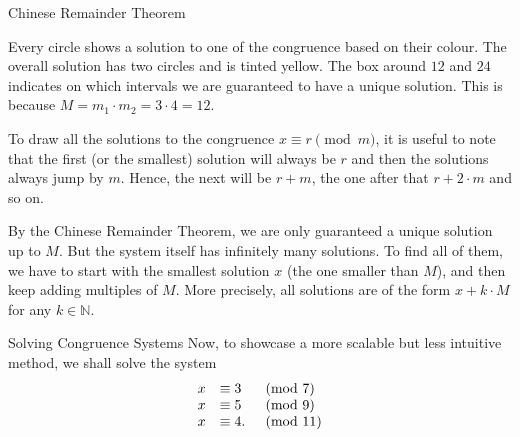 \documentclass[final]{beamer}
\newlength{\colwidth}
\newcommand{\N}{\mathbb{N}}
\begin{document}
\begin{frame}[t]
\begin{columns}[t]
\begin{column}{\colwidth}
\begin{alertblock}{Chinese Remainder Theorem}
\begin{center}
\end{center}
Every circle shows a solution to one of the congruence based on their colour.
The overall solution has two circles and is tinted yellow. The box around $12$
and $24$ indicates on which intervals we are guaranteed to have a unique
solution. This is because $M = m_1 \cdot m_2 = 3 \cdot 4 = 12$.

To draw all the solutions to the congruence $x \equiv r \pmod{m}$, it is useful
to note that the first (or the smallest) solution will always be $r$ and then
the solutions always jump by $m$. Hence, the next will be $r+m$, the one after
that $r+2 \cdot m$ and so on.

By the Chinese Remainder Theorem, we are only guaranteed a \alert{unique
solution up to $M$}. But the \alert{system itself has infinitely many
solutions}. To find all of them, we have to start with the smallest solution $x$
(the one smaller than $M$), and then keep adding multiples of $M$. More
precisely, \alert{all solutions are of the form $x + k \cdot M$} for any $k \in
\N$.
\end{alertblock}
 \begin{block}{Solving Congruence Systems}
  Now, to showcase a more scalable but less intuitive method, we shall solve the system
  \[
   \begin{array}{r l l}
    x & \equiv 3  &\pmod{7}\\
    x & \equiv 5  &\pmod{9}\\
    x & \equiv 4. &\pmod{11}
   \end{array}
  \]
  

\end{block}
\end{column}
\end{columns}
\end{frame}
\end{document}
